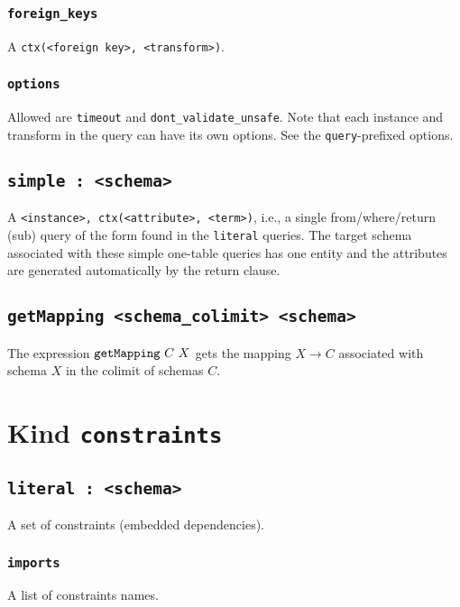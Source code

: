 \documentclass[10pt]{book}
\begin{document}
\subsection{{\tt foreign\_keys}}
A {\tt ctx(<foreign key>, <transform>)}.

\subsection{{\tt options}}
Allowed are {\tt timeout} and {\tt dont\_validate\_unsafe}.  Note that each instance and transform in the query can have its own options.  See the {\tt query}-prefixed options.

\section{{\tt simple : <schema>}} 

A {\tt <instance>, ctx(<attribute>, <term>)}, i.e., a single from/where/return (sub) query of the form found in the {\tt literal} queries.  The target schema associated with these simple one-table queries has one entity and the attributes are generated automatically by the return clause. 

\section{{\tt getMapping <schema\_colimit> <schema>}}

The expression ${\tt getMapping} \ C \ X$ gets the mapping $X \to C$ associated with schema $X$ in the colimit of schemas $C$.

\chapter{Kind {\tt constraints}}

\section{{\tt literal : <schema>}}

A set of constraints (embedded dependencies). 

\subsection{{\tt imports}}
A list of constraints names.
\end{document}
